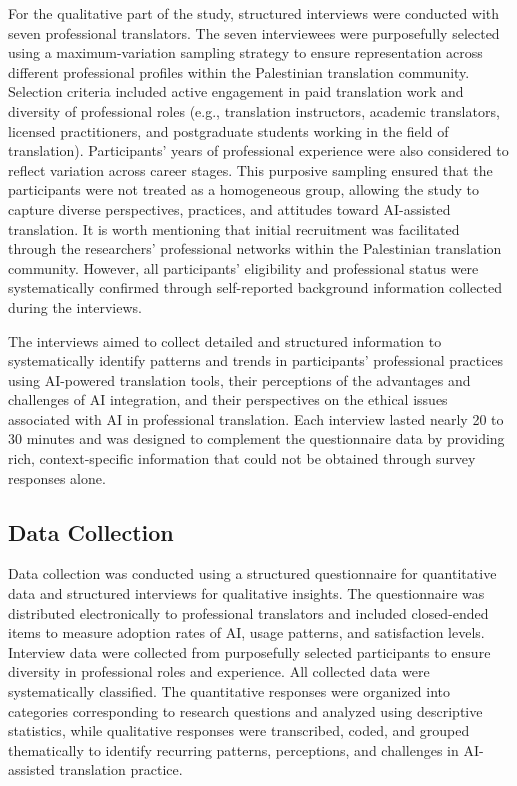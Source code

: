 \documentclass[english]{textolivre}
\begin{document}
For the qualitative part of the study, structured interviews were conducted with seven professional translators. The seven interviewees were purposefully selected using a maximum-variation sampling strategy to ensure representation across different professional profiles within the Palestinian translation community. Selection criteria included active engagement in paid translation work and diversity of professional roles (e.g., translation instructors, academic translators, licensed practitioners, and postgraduate students working in the field of translation). Participants’ years of professional experience were also considered to reflect variation across career stages. This purposive sampling ensured that the participants were not treated as a homogeneous group, allowing the study to capture diverse perspectives, practices, and attitudes toward AI-assisted translation. It is worth mentioning that initial recruitment was facilitated through the researchers’ professional networks within the Palestinian translation community. However, all participants’ eligibility and professional status were systematically confirmed through self-reported background information collected during the interviews.

The interviews aimed to collect detailed and structured information to systematically identify patterns and trends in participants’ professional practices using AI-powered translation tools, their perceptions of the advantages and challenges of AI integration, and their perspectives on the ethical issues associated with AI in professional translation. Each interview lasted nearly 20 to 30 minutes and was designed to complement the questionnaire data by providing rich, context-specific information that could not be obtained through survey responses alone.

\subsection{Data Collection}\label{sec-autores}
Data collection was conducted using a structured questionnaire for quantitative data and structured interviews for qualitative insights. The questionnaire was distributed electronically to professional translators and included closed-ended items to measure adoption rates of AI, usage patterns, and satisfaction levels. Interview data were collected from purposefully selected participants to ensure diversity in professional roles and experience. All collected data were systematically classified. The quantitative responses were organized into categories corresponding to research questions and analyzed using descriptive statistics, while qualitative responses were transcribed, coded, and grouped thematically to identify recurring patterns, perceptions, and challenges in AI-assisted translation practice.
\end{document}
